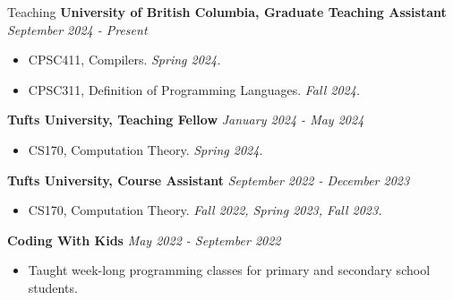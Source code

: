 \documentclass{resume} %
\begin{document}
\begin{rSection}{Teaching}
{\bf University of British Columbia, Graduate Teaching Assistant} \hfill {\em September 2024 - Present}
\begin{itemize}
    \item CPSC411, Compilers. {\it Spring 2024.}
    \item CPSC311, Definition of Programming Languages. {\it Fall 2024.}
\end{itemize}

{\bf Tufts University, Teaching Fellow} \hfill {\em January 2024 - May 2024}
\begin{itemize}
    \item CS170, Computation Theory. {\it Spring 2024.}
\end{itemize}

{\bf Tufts University, Course Assistant} \hfill {\em September 2022 - December 2023}
\begin{itemize}
    \item CS170, Computation Theory. {\it Fall 2022, Spring 2023, Fall 2023.}
\end{itemize}

{\bf Coding With Kids} \hfill {\em May 2022 - September 2022}
\begin{itemize}
    \item Taught week-long programming classes for primary and secondary school students.
\end{itemize}
    

\end{rSection}
\end{document}
